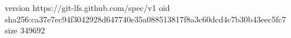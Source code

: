 version https://git-lfs.github.com/spec/v1
oid sha256:ca37e7ec94f3042928d647740e35a088513817f8a3c60dcd4c7b30b43eec5fc7
size 349692
